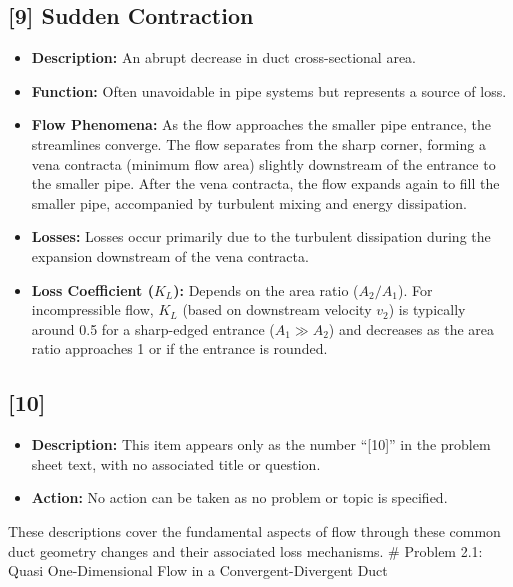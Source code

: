 \hypertarget{sudden-contraction}{%
\subsection{{[}9{]} Sudden Contraction}\label{sudden-contraction}}

\begin{itemize}
\tightlist
\item
  \textbf{Description:} An abrupt decrease in duct cross-sectional area.
\item
  \textbf{Function:} Often unavoidable in pipe systems but represents a
  source of loss.
\item
  \textbf{Flow Phenomena:} As the flow approaches the smaller pipe
  entrance, the streamlines converge. The flow separates from the sharp
  corner, forming a vena contracta (minimum flow area) slightly
  downstream of the entrance to the smaller pipe. After the vena
  contracta, the flow expands again to fill the smaller pipe,
  accompanied by turbulent mixing and energy dissipation.
\item
  \textbf{Losses:} Losses occur primarily due to the turbulent
  dissipation during the expansion downstream of the vena contracta.
\item
  \textbf{Loss Coefficient (\(K_L\)):} Depends on the area ratio
  (\(A_2/A_1\)). For incompressible flow, \(K_L\) (based on downstream
  velocity \(v_2\)) is typically around 0.5 for a sharp-edged entrance
  (\(A_1 \gg A_2\)) and decreases as the area ratio approaches 1 or if
  the entrance is rounded.
\end{itemize}

\hypertarget{section}{%
\subsection{{[}10{]}}\label{section}}

\begin{itemize}
\tightlist
\item
  \textbf{Description:} This item appears only as the number
  ``{[}10{]}'' in the problem sheet text, with no associated title or
  question.
\item
  \textbf{Action:} No action can be taken as no problem or topic is
  specified.
\end{itemize}

These descriptions cover the fundamental aspects of flow through these
common duct geometry changes and their associated loss mechanisms. \#
Problem 2.1: Quasi One-Dimensional Flow in a Convergent-Divergent Duct


